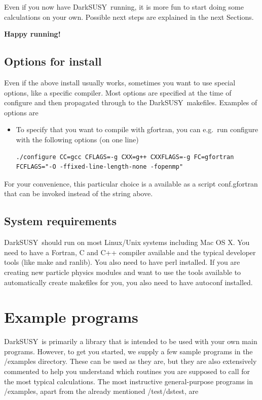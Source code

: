 \documentclass[a4paper,10pt,oneside]{book}
\newcommand{\code}[1]{\ft{#1}}
\newcommand{\ds}{{\sffamily DarkSUSY}}
\newcommand{\ft}[1]{\textsf{#1}}
\begin{document}
\bigskip
Even if you now have \ds\ running, it is more fun to start doing some calculations on your own. Possible next steps are explained in 
the next Sections.

\bigskip
\centerline{\bfseries Happy running!}

\subsection{Options for install}
Even if the above install usually works, sometimes you want to use special options, like a specific compiler. Most options are specified at the time of configure and then propagated through to the \ds\ makefiles. Examples of options are
\begin{itemize}
\item To specify that you want to compile with \code{gfortran}, you can e.g.\ run \code{configure} with the following options (on one line)
\begin{verbatim}
./configure CC=gcc CFLAGS=-g CXX=g++ CXXFLAGS=-g FC=gfortran
FCFLAGS="-O -ffixed-line-length-none -fopenmp"
\end{verbatim}
\end{itemize}
For your convenience, this particular choice is a available as a script \code{conf.gfortran} that can be invoked instead of the string above.


\subsection{System requirements}

\ds\ should run on most Linux/Unix systems including Mac OS X. You need to have a Fortran, C and C++ compiler available and the typical developer tools (like \code{make} and \code{ranlib}). You also need to have \code{perl} installed. If you are creating new particle physics modules and want to use the tools available to automatically create makefiles for you, you also need to have \code{autoconf} installed.


\section{Example programs}



\ds\ is primarily a library that is intended to be used with your own main programs. However, to get you started, we supply a few sample programs in the \code{/examples} directory. These can be used as they are, but they are also extensively commented to help you understand which routines you are supposed to call for the most typical calculations. The most instructive general-purpose programs in \code{/examples}, apart from the already 
mentioned \code{/test/dstest}, are
\end{document}
